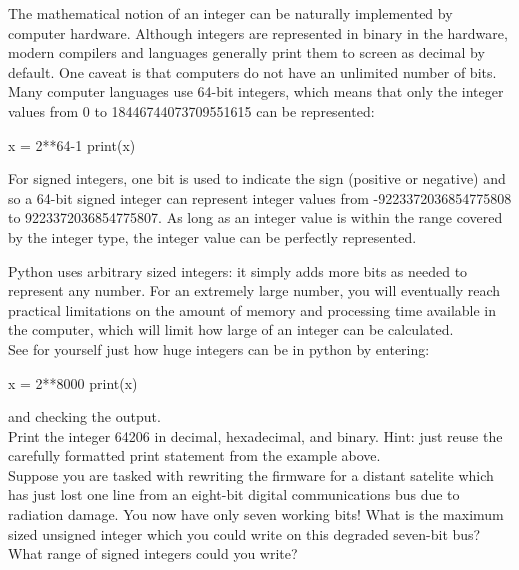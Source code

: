 The mathematical notion of an integer can be naturally implemented by
computer hardware.  Although integers are represented in binary in the
hardware, modern compilers and languages generally print them to
screen as decimal by default.  One caveat is that computers do not
have an unlimited number of bits.  Many computer languages use 64-bit
integers, which means that only the integer values from 0 to
18446744073709551615 can be represented:
\begin{python}
x = 2**64-1
print(x) 
\end{python}
For signed integers, one bit is used to indicate the sign (positive or
negative) and so a 64-bit signed integer can represent integer values
from -9223372036854775808 to 9223372036854775807.  As long as an
integer value is within the range covered by the integer type, the
integer value can be perfectly represented.

Python uses arbitrary sized integers: it simply adds more bits as
needed to represent any number.  For an extremely large number, you
will eventually reach practical limitations on the amount of memory
and processing time available in the computer, which will limit how
large of an integer can be calculated.\\

\plot See for yourself just how huge integers can be in python by entering:
\begin{python}
x = 2**8000
print(x)
\end{python}
and checking the output.\\

\plot Print the integer 64206 in decimal, hexadecimal, and binary.  Hint: just reuse the carefully formatted print statement from the example above.\\

\plot Suppose you are tasked with rewriting the firmware for a 
distant satelite which has just lost one line from an eight-bit
digital communications bus due to radiation damage.  You now have only
seven working bits!  What is the maximum sized unsigned integer which
you could write on this degraded seven-bit bus?  What range of signed
integers could you write? \\

